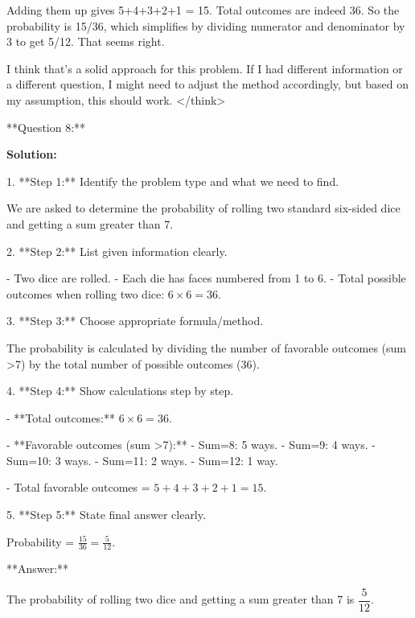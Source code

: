 Adding them up gives 5+4+3+2+1 = 15. Total outcomes are indeed 36. So the probability is 15/36, which simplifies by dividing numerator and denominator by 3 to get 5/12. That seems right.

I think that's a solid approach for this problem. If I had different information or a different question, I might need to adjust the method accordingly, but based on my assumption, this should work.
</think>

**Question 8:**

\textbf{Solution:}

1. **Step 1:** Identify the problem type and what we need to find.

   We are asked to determine the probability of rolling two standard six-sided dice and getting a sum greater than 7.

2. **Step 2:** List given information clearly.

   - Two dice are rolled.
   - Each die has faces numbered from 1 to 6.
   - Total possible outcomes when rolling two dice: \(6 \times 6 = 36\).

3. **Step 3:** Choose appropriate formula/method.

   The probability is calculated by dividing the number of favorable outcomes (sum >7) by the total number of possible outcomes (36).

4. **Step 4:** Show calculations step by step.

   - **Total outcomes:** \(6 \times 6 = 36\).
   
   - **Favorable outcomes (sum >7):**
     - Sum=8: 5 ways.
     - Sum=9: 4 ways.
     - Sum=10: 3 ways.
     - Sum=11: 2 ways.
     - Sum=12: 1 way.
   
   - Total favorable outcomes = \(5 + 4 + 3 + 2 + 1 = 15\).

5. **Step 5:** State final answer clearly.

   Probability = \(\frac{15}{36} = \frac{5}{12}\).

**Answer:**

The probability of rolling two dice and getting a sum greater than 7 is \(\boxed{\dfrac{5}{12}}\).